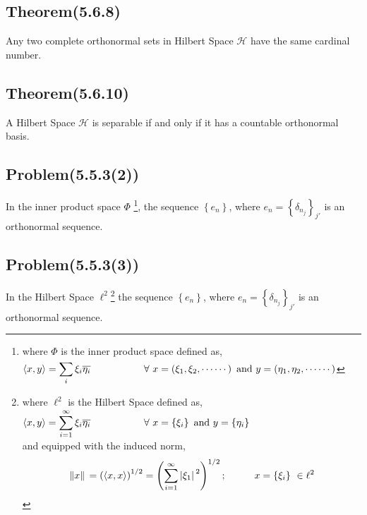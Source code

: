 \documentclass[12pt, a4paper]{article} %
\begin{document}
       
    \begin{tcolorbox}[colback=gray!5!white, colframe=blue!50!black,title=\begin{center}
        \section{ Assignment Problems}
    \end{center}]
        \subsection{Theorem(5.6.8)}
           Any two complete orthonormal sets in Hilbert Space $\mathcal{H}$ have the same cardinal number.
        \subsection{Theorem(5.6.10)}
           A Hilbert Space $\mathcal{H}$ is separable if and only if it has a countable orthonormal basis.   
        \subsection{Problem(5.5.3(2))}
           In the inner product space $\Phi$ \footnote{where $\Phi$ is the inner product space defined as, $\displaystyle{\langle x, y \rangle = \sum_{i}^{}\xi_i \overline{\eta_{i}}} \hspace*{1.9cm} \forall\  x = \left(\xi_1, \xi_2, \cdots \cdots \right)\ \mbox{and}\ y = \left(\eta_1, \eta_2, \cdots \cdots\right)$}, the sequence $\left\{e_n\right\}$, where $e_n = \left\{\delta_{n_{j}}\right\}_{j'}$ is an orthonormal sequence.   
        \subsection{Problem(5.5.3(3))}
           In the Hilbert Space $\ell^2$\footnote{where $\ell^2$ is the Hilbert Space defined as, $\displaystyle{\langle x, y \rangle = \sum_{i=1}^{\infty}\xi_i \overline{\eta_{i}}} \hspace*{1.9cm} \forall\  x = \left\{\xi_i \right\}\ \mbox{and}\  y = \left\{\eta_i \right\}$\\ and equipped with the induced norm, \[\norm*{x} = \left(\langle x, x \rangle\right)^{1/2} = \left(\sum_{i=1}^{\infty} \abs*{\xi_1}^2\right)^{1/2}; \hspace*{1cm} x = \left\{\xi_i\right\}\ \in \ell^2\]} the sequence $\left\{e_n\right\}$, where $e_n = \left\{\delta_{n_{j}}\right\}_{j'}$ is an orthonormal sequence.   
    \end{tcolorbox}
\end{document}
